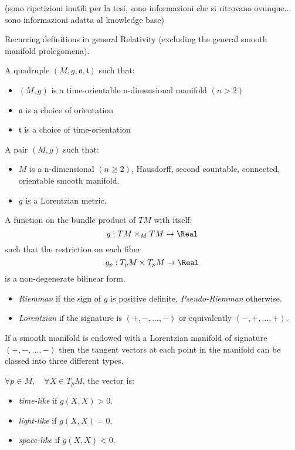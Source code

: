 \documentclass[Main]{subfiles}
\begin{document}
	(sono ripetizioni inutili per la tesi, sono informazioni che si ritrovano ovunque... sono informazioni adatta al knowledge base)

	
	Recurring definitions in general Relativity (excluding the general smooth manifold prolegomena).

	\begin{definition}
		A quadruple $(M, g, \mathfrak{o}, \mathfrak{t})$ such that:
		\begin{itemize}
			\item $(M,g)$ is a time-orientable n-dimensional manifold $(n>2)$
			\item $\mathfrak{o}$ is a choice of orientation
			\item $\mathfrak{t}$ is a choice of time-orientation
		\end{itemize}
	\end{definition}

	\begin{definition}
		A pair $(M, g)$ such that:
		\begin{itemize}
			\item $M$ is a n-dimensional $(n\geq2)$, Hausdorff, second countable, connected, orientable smooth manifold.
			\item $g$ is a Lorentzian metric.
		\end{itemize}
	\end{definition}
			
	\begin{definition}[Metric]
		A function on the bundle product of $TM$ with itself: $$g: TM \times_M TM \rightarrow \Real$$ such that the restriction on each fiber $$g_p: T_pM \times T_pM \rightarrow \Real $$ is a non-degenerate bilinear form.
	\end{definition}
	
	\begin{notationfix}
		 \begin{itemize}
		 	\item \emph{Riemman} if the sign of $g$ is positive definite, \emph{Pseudo-Riemman} otherwise.
		 	\item \emph{Lorentzian} if the signature is $(+, -, \ldots,- )$ or equivalently $(-,+,\ldots,+)$.
		 \end{itemize}
	\end{notationfix}

	\begin{observation}
		If a smooth manifold is endowed with a Lorentzian manifold of signature $(+, -, \ldots, -)$ then the tangent vectors at each point in the manifold can be classed into three different types. 
		\begin{notationfix}
			$\forall p \in M, \quad \forall X \in T_pM$, the vector is:
			\begin{itemize}
				\item \emph{time-like} if $g(X,X)>0$.
				\item \emph{light-like} if $g(X,X)=0$.
				\item \emph{space-like} if $g(X,X)<0$.
			\end{itemize}
		\end{notationfix}
	\end{observation}
\end{document}
